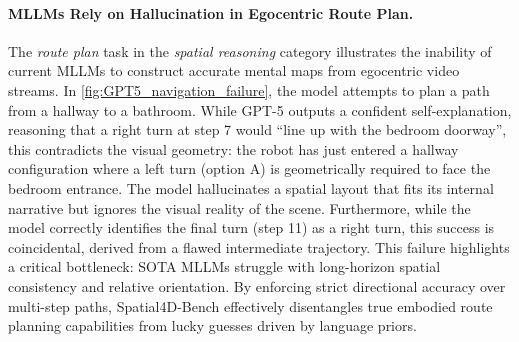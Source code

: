 \paragraph{MLLMs Rely on Hallucination in Egocentric Route Plan.}
The \textit{route plan} task in the \textit{spatial reasoning} category illustrates the inability of current MLLMs to construct accurate mental maps from egocentric video streams. 
In \cref{fig:GPT5_navigation_failure}, the model attempts to plan a path from a hallway to a bathroom. 
While GPT-5 outputs a confident self-explanation, reasoning that a right turn at step 7 would ``line up with the bedroom doorway'', this contradicts the visual geometry: the robot has just entered a hallway configuration where a left turn (option A) is geometrically required to face the bedroom entrance. 
The model hallucinates a spatial layout that fits its internal narrative but ignores the visual reality of the scene. 
Furthermore, while the model correctly identifies the final turn (step 11) as a right turn, this success is coincidental, derived from a flawed intermediate trajectory. 
This failure highlights a critical bottleneck: SOTA MLLMs struggle with long-horizon spatial consistency and relative orientation. 
By enforcing strict directional accuracy over multi-step paths, Spatial4D-Bench effectively disentangles true embodied route planning capabilities from lucky guesses driven by language priors.


